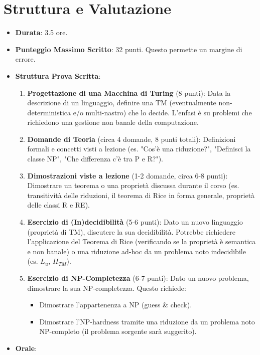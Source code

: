 \documentclass[a4paper]{article}
\theoremstyle{definition} %
\begin{document}
\section{Struttura e Valutazione}
\begin{itemize}
    \item \textbf{Durata}: 3.5 ore.
    \item \textbf{Punteggio Massimo Scritto}: 32 punti. Questo permette un margine di errore.
    \item \textbf{Struttura Prova Scritta}:
    \begin{enumerate}
        \item \textbf{Progettazione di una Macchina di Turing} (8 punti): Data la descrizione di un linguaggio, definire una TM (eventualmente non-deterministica e/o multi-nastro) che lo decide. L'enfasi è su problemi che richiedono una gestione non banale della computazione.
        \item \textbf{Domande di Teoria} (circa 4 domande, 8 punti totali): Definizioni formali e concetti visti a lezione (es. "Cos'è una riduzione?", "Definisci la classe NP", "Che differenza c'è tra P e R?").
        \item \textbf{Dimostrazioni viste a lezione} (1-2 domande, circa 6-8 punti): Dimostrare un teorema o una proprietà discussa durante il corso (es. transitività delle riduzioni, il teorema di Rice in forma generale, proprietà delle classi R e RE).
        \item \textbf{Esercizio di (In)decidibilità} (5-6 punti): Dato un nuovo linguaggio (proprietà di TM), discutere la sua decidibilità. Potrebbe richiedere l'applicazione del Teorema di Rice (verificando se la proprietà è semantica e non banale) o una riduzione ad-hoc da un problema noto indecidibile (es. $L_u$, $H_{TM}$).
        \item \textbf{Esercizio di NP-Completezza} (6-7 punti): Dato un nuovo problema, dimostrare la sua NP-completezza. Questo richiede:
        \begin{itemize}
            \item Dimostrare l'appartenenza a NP (guess \& check).
            \item Dimostrare l'NP-hardness tramite una riduzione da un problema noto NP-completo (il problema sorgente sarà suggerito).
        \end{itemize}
    \end{enumerate}
    \item \textbf{Orale}:
    \begin{itemize}

\end{itemize}
\end{itemize}
\end{document}
